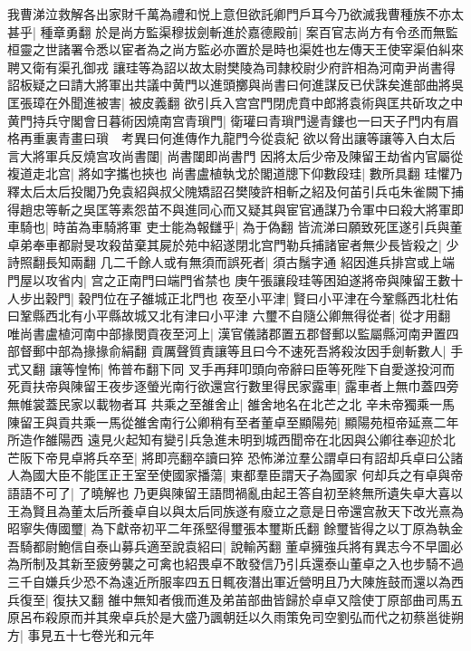 我曹涕泣救解各出家財千萬為禮和悦上意但欲託卿門戶耳今乃欲滅我曹種族不亦太甚乎|{
	種章勇翻}
於是尚方監渠穆拔劍斬進於嘉德殿前|{
	案百官志尚方有令丞而無監桓靈之世諸署令悉以宦者為之尚方監必亦置於是時也渠姓也左傳天王使宰渠伯糾來聘又衛有渠孔御戎}
讓珪等為詔以故太尉樊陵為司隸校尉少府許相為河南尹尚書得詔板疑之曰請大將軍出共議中黄門以進頭擲與尚書曰何進謀反已伏誅矣進部曲將吳匡張璋在外聞進被害|{
	被皮義翻}
欲引兵入宫宫門閉虎賁中郎將袁術與匡共斫攻之中黄門持兵守閣會日暮術因燒南宫青瑣門|{
	衛瓘曰青瑣門邊青鏤也一曰天子門内有眉格再重裏青畫曰瑣　考異曰何進傳作九龍門今從袁紀}
欲以脅出讓等讓等入白太后言大將軍兵反燒宫攻尚書闥|{
	尚書闥即尚書門}
因將太后少帝及陳留王劫省内官屬從複道走北宫|{
	將如字攜也挾也}
尚書盧植執戈於閣道牕下仰數段珪|{
	數所具翻}
珪懼乃釋太后太后投閣乃免袁紹與叔父隗矯詔召樊陵許相斬之紹及何苖引兵屯朱雀闕下捕得趙忠等斬之吳匡等素怨苗不與進同心而又疑其與宦官通謀乃令軍中曰殺大將軍即車騎也|{
	時苖為車騎將軍}
吏士能為報讎乎|{
	為于偽翻}
皆流涕曰願致死匡遂引兵與董卓弟奉車都尉旻攻殺苗棄其屍於苑中紹遂閉北宫門勒兵捕諸宦者無少長皆殺之|{
	少詩照翻長知兩翻}
几二千餘人或有無須而誤死者|{
	須古鬚字通}
紹因進兵排宫或上端門屋以攻省内|{
	宫之正南門曰端門省禁也}
庚午張讓段珪等困廹遂將帝與陳留王數十人步出穀門|{
	穀門位在子雒城正北門也}
夜至小平津|{
	賢曰小平津在今鞏縣西北杜佑曰鞏縣西北有小平縣故城又北有津曰小平津}
六璽不自隨公卿無得從者|{
	從才用翻}
唯尚書盧植河南中部掾閔貢夜至河上|{
	漢官儀諸郡置五郡督郵以監屬縣河南尹置四部督郵中部為掾掾俞絹翻}
貢厲聲質責讓等且曰今不速死吾將殺汝因手劍斬數人|{
	手式又翻}
讓等惶怖|{
	怖普布翻下同}
叉手再拜叩頭向帝辭曰臣等死陛下自愛遂投河而死貢扶帝與陳留王夜步逐螢光南行欲還宫行數里得民家露車|{
	露車者上無巾蓋四旁無帷裳蓋民家以載物者耳}
共乘之至雒舍止|{
	雒舍地名在北芒之北}
辛未帝獨乘一馬陳留王與貢共乘一馬從雒舍南行公卿稍有至者董卓至顯陽苑|{
	顯陽苑桓帝延熹二年所造作雒陽西}
遠見火起知有變引兵急進未明到城西聞帝在北因與公卿往奉迎於北芒阪下帝見卓將兵卒至|{
	將即亮翻卒讀曰猝}
恐怖涕泣羣公謂卓曰有詔却兵卓曰公諸人為國大臣不能匡正王室至使國家播蕩|{
	東都羣臣謂天子為國家}
何却兵之有卓與帝語語不可了|{
	了曉解也}
乃更與陳留王語問禍亂由起王答自初至終無所遺失卓大喜以王為賢且為董太后所養卓自以與太后同族遂有廢立之意是日帝還宫赦天下改光熹為昭寧失傳國璽|{
	為下獻帝初平二年孫堅得璽張本璽斯氏翻}
餘璽皆得之以丁原為執金吾騎都尉鮑信自泰山募兵適至說袁紹曰|{
	說輸芮翻}
董卓擁強兵將有異志今不早圖必為所制及其新至疲勞襲之可禽也紹畏卓不敢發信乃引兵還泰山董卓之入也步騎不過三千自嫌兵少恐不為遠近所服率四五日輒夜潛出軍近營明且乃大陳旌鼓而還以為西兵復至|{
	復扶又翻}
雒中無知者俄而進及弟苖部曲皆歸於卓卓又陰使丁原部曲司馬五原呂布殺原而并其衆卓兵於是大盛乃諷朝廷以久雨策免司空劉弘而代之初蔡邕徙朔方|{
	事見五十七卷光和元年}
